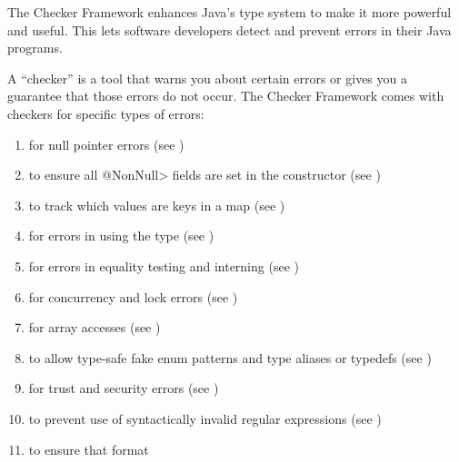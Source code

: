 \htmlhr
{}

The Checker Framework enhances Java's type system to make it more powerful
and useful.
This lets software developers detect and
prevent errors in their Java programs.

A ``checker'' is a tool that warns you about certain errors or gives you a
guarantee that those errors do not occur.
The Checker Framework comes with checkers for specific types of errors:

\begin{enumerate}

\item
   for null pointer errors
  (see )
\item
   to ensure all
  \<@NonNull> fields are set in the constructor (see
  )
\item
   to track which values are
  keys in a map (see )
\item
   for errors in using the
   type (see
  )
\item
   for errors in equality
  testing and interning (see )
\item
   for concurrency and lock errors
  (see )
\item
   for array accesses
  (see )
\item
   to allow type-safe fake enum
  patterns and type aliases or typedefs (see )
\item
   for trust and security errors
  (see )
\item
   to prevent use of syntactically
  invalid regular expressions (see )
\item
   to ensure that format

\end{enumerate}
